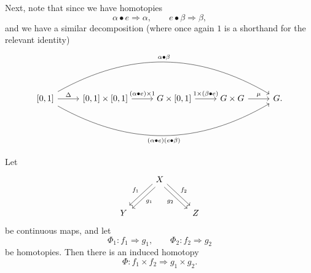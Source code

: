 \documentclass[11pt, letterpaper]{article}
\begin{document}
Next, note that since we have homotopies
\[
	\alpha \bullet e\Rightarrow \alpha ,\qquad e\bullet \beta \Rightarrow \beta ,
\]
and we have a similar decomposition (where once again $1$ is a shorthand for the relevant identity)
\[\begin{tikzcd}[row sep = 2.5em, column sep = 2.5em]
	\left[ 0,1 \right] \ar[" \Delta  ", r] \ar[bend left, " \alpha\bullet \beta  ", rrrr]\ar[bend right, " (\alpha \bullet e)(e\bullet \beta ) "', rrrr]  & \left[ 0,1 \right] \times \left[ 0,1 \right] \ar[" (\alpha \bullet e)\times 1 ", r]  & G\times \left[ 0,1 \right] \ar[" 1\times (\beta \bullet e) ", r]  & G\times G\ar[" \mu  ", r]  & G.
\end{tikzcd}\]
\begin{lemma}\label{lma:4}
	Let
	\[\begin{tikzcd}[row sep = 2.5em, column sep = 2.5em]
	 & X\ar[" f_1 "', shift right, dl] \ar[" g_1 ", shift left, dl] \ar[" f_2 ", shift left, dr] \ar[" g_2 "', shift right, dr]  &  \\
	Y &  & Z
	\end{tikzcd}\]
	be continuous maps, and let
	\[
		\Phi _1 : f_1 \Rightarrow g_1, \qquad \Phi _2 : f_2 \Rightarrow g_2
	\]
	be homotopies. Then there is an induced homotopy
	\[
		\Phi : f_1\times f_2 \Rightarrow g_1\times g_2
	.\]
\end{lemma}
\end{document}
